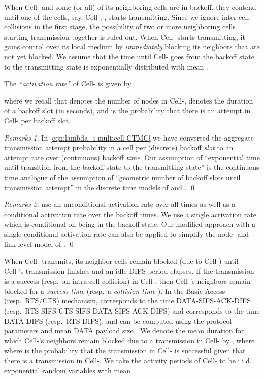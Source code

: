 \documentclass[10pt,a4paper,journal]{IEEEtran}
\theoremstyle{definition}
\theoremstyle{remark}
\newtheorem{remark}{Remarks}[section] \newtheorem{discussion}{Discussion}[section] \newtheorem{example}{Example}[section]
\theoremstyle{plain}
\begin{document}
When Cell- and some (or all) of its neighboring cells are in backoff, they contend until one of the cells, say, Cell-, , starts transmitting. Since we ignore inter-cell collisions in the first stage, the possibility of two or more neighboring cells starting transmission together is ruled out. When Cell- starts transmitting, it gains control over its local medium by \textit{immediately} blocking its neighbors that are not yet blocked. We assume that the time until Cell- goes from the backoff state to the transmitting state is exponentially distributed with mean .  

The \textit{``activation rate''}  of Cell- is given by 
 
where we recall that  denotes the number of nodes in Cell-,  denotes the duration of a backoff slot (in seconds), and  is the probability that there is an attempt in Cell- per backoff slot. 


\begin{remark}
\label{rmk:exponential-activation}
In \eqref{eqn:lambda_i-multicell-CTMC} we have converted the aggregate transmission attempt probability in a cell per (discrete) backoff \textit{slot} to an attempt rate over (continuous) backoff \textit{time}.  Our assumption of ``exponential time until transition from the backoff state to the transmitting state'' is the continuous time analogue of the assumption of ``geometric number of backoff slots until transmission attempt'' in the discrete time models of \cite{wanet.bianchi00performance} and \cite{wanet.kumar_etal07new_insights}. \hfill \qed
\end{remark}


\begin{remark}
\label{rmk:compare-garetto}
\cite{wanet.garetto_etal08starvation} use an unconditional activation rate  over all times as well as a conditional activation rate  over the backoff times. We use a single activation rate  which is conditional on being in the backoff state. Our modified approach with a single conditional activation rate can also be applied to simplify the node- and link-level model of \cite{wanet.garetto_etal08starvation}. \hfill \qed
\end{remark}



When Cell- transmits, its neighbor cells remain blocked (due to Cell-) until Cell-'s transmission finishes and an idle DIFS period elapses. If the transmission is a success (resp.~an intra-cell collision) in Cell-, then Cell-'s neighbors remain blocked for a \textit{success time}  (resp.~a \textit{collision time} ). In the Basic Access (resp.~RTS/CTS) mechanism,  corresponds to the time DATA-SIFS-ACK-DIFS (resp.~RTS-SIFS-CTS-SIFS-DATA-SIFS-ACK-DIFS) and  corresponds to the time DATA-DIFS (resp.~RTS-DIFS).  and  can be computed using the protocol parameters and mean DATA payload size . We denote the mean duration for which Cell-'s neighbors remain blocked due to a transmission in Cell- by , where  
where  is the probability that the transmission in Cell- is successful given that there is a transmission in Cell-. We take the activity periods of Cell- to be i.i.d. exponential random variables with mean . 
\end{document}
